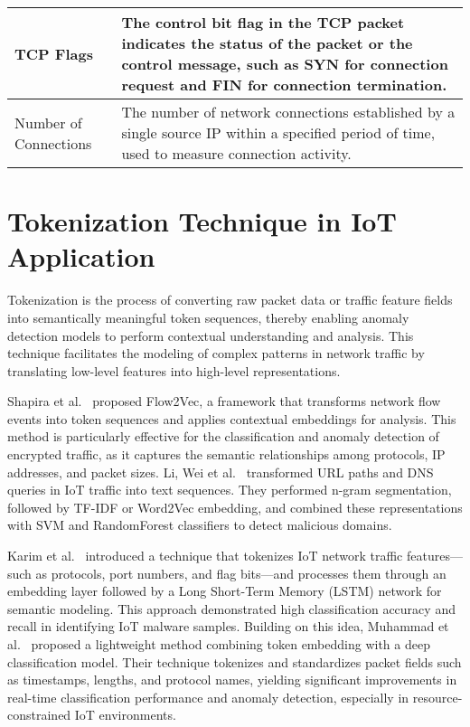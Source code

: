 \begin{ZhChapter}
\begin{table*}[htbp]
{{\begin{tabular}{| l | p{10cm} |}
                    \hline
                    TCP Flags \cite{sharafaldin2018cicflowmeter}           &
                    The control bit flag in the TCP packet indicates the status of the packet or the control message, such as SYN for connection request and FIN for connection termination.           \\
                    \hline
                    Number of Connections \cite{tang2016deep}              &
                    The number of network connections established by a single source IP within a specified period of time, used to measure connection activity.                                        \\
                    \hline
                \end{tabular}
            }
        }
    \end{table*}




    \section{Tokenization Technique in IoT Application}
    Tokenization is the process of converting raw packet data or traffic feature fields into semantically meaningful token sequences, thereby enabling anomaly detection models to perform contextual understanding and analysis. This technique facilitates the modeling of complex patterns in network traffic by translating low-level features into high-level representations.

    Shapira et al.~\cite{shapira2021flow} proposed Flow2Vec, a framework that transforms network flow events into token sequences and applies contextual embeddings for analysis. This method is particularly effective for the classification and anomaly detection of encrypted traffic, as it captures the semantic relationships among protocols, IP addresses, and packet sizes.
    Li, Wei et al.~\cite{li2020embedding} transformed URL paths and DNS queries in IoT traffic into text sequences. They performed n-gram segmentation, followed by TF-IDF or Word2Vec embedding, and combined these representations with SVM and RandomForest classifiers to detect malicious domains.

    Karim et al.~\cite{karim2019lstm} introduced a technique that tokenizes IoT network traffic features—such as protocols, port numbers, and flag bits—and processes them through an embedding layer followed by a Long Short-Term Memory (LSTM) network for semantic modeling. This approach demonstrated high classification accuracy and recall in identifying IoT malware samples.
    Building on this idea, Muhammad et al.~\cite{muhammad2020efficient} proposed a lightweight method combining token embedding with a deep classification model. Their technique tokenizes and standardizes packet fields such as timestamps, lengths, and protocol names, yielding significant improvements in real-time classification performance and anomaly detection, especially in resource-constrained IoT environments.


\end{ZhChapter}
